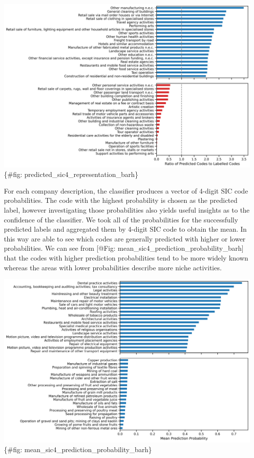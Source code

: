 \documentclass[
]{article}
\begin{document}
\includegraphics{../../figures/predicted_sic4_representation_barh.png}\{\#fig:
predicted\_sic4\_representation\_barh\}

For each company description, the classifier produces a vector of
4-digit SIC code probabilities. The code with the highest probability is
chosen as the predicted label, however investigating those probabilities
also yields useful insights as to the confidence of the classifier. We
took all of the probabilities for the successfully predicted labels and
aggregated them by 4-digit SIC code to obtain the mean. In this way are
able to see which codes are generally predicted with higher or lower
probabilities. We can see from {[}@Fig:
mean\_sic4\_prediction\_probability\_barh{]} that the codes with higher
prediction probabilities tend to be more widely known whereas the areas
with lower probabilities describe more niche activities.

\includegraphics{../../figures/mean_sic4_prediction_probability_barh.png}\{\#fig:
mean\_sic4\_prediction\_probability\_barh\}
\end{document}
